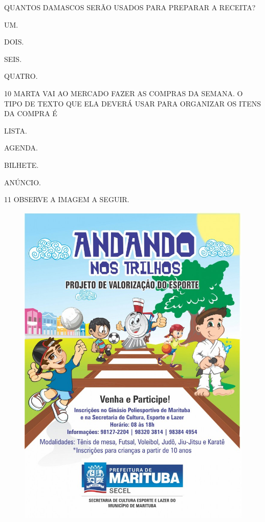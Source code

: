 QUANTOS DAMASCOS SERÃO USADOS PARA PREPARAR A RECEITA?

\begin{escolha}

\item UM.

\item DOIS.

\item SEIS.

\item QUATRO.

\end{escolha}

\num{10} MARTA VAI AO MERCADO FAZER AS COMPRAS DA SEMANA.
O TIPO DE TEXTO QUE ELA DEVERÁ USAR PARA ORGANIZAR OS ITENS DA COMPRA É

\begin{escolha}

\item LISTA.

\item AGENDA.

\item BILHETE.

\item ANÚNCIO.

\end{escolha}

\num{11} OBSERVE A IMAGEM A SEGUIR.

\begin{figure}[H]
\centering
\includegraphics[width=.6\textwidth]{./media/image235.jpg}
\end{figure}


